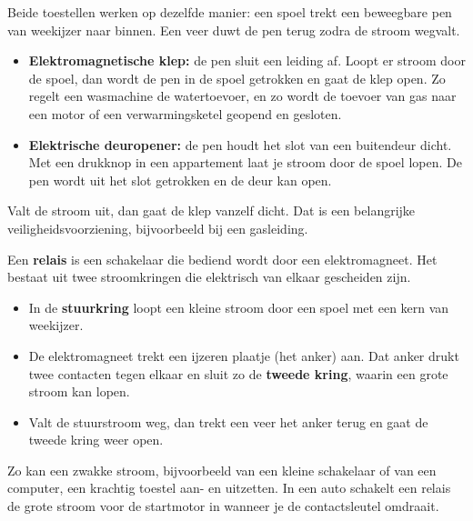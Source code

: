 \documentclass{ximera}
\begin{document}
\begin{example}[expandable=true,title={Extra: elektromagnetische klep en elektrische deuropener}]\nl
    Beide toestellen werken op dezelfde manier: een spoel trekt een beweegbare pen van weekijzer naar binnen. Een veer duwt de pen terug zodra de stroom wegvalt.
    \begin{itemize}
        \item \textbf{Elektromagnetische klep:} de pen sluit een leiding af. Loopt er stroom door de spoel, dan wordt de pen in de spoel getrokken en gaat de klep open. Zo regelt een wasmachine de watertoevoer, en zo wordt de toevoer van gas naar een motor of een verwarmingsketel geopend en gesloten.
        \item \textbf{Elektrische deuropener:} de pen houdt het slot van een buitendeur dicht. Met een drukknop in een appartement laat je stroom door de spoel lopen. De pen wordt uit het slot getrokken en de deur kan open.
    \end{itemize}
    Valt de stroom uit, dan gaat de klep vanzelf dicht. Dat is een belangrijke veiligheidsvoorziening, bijvoorbeeld bij een gasleiding.
\end{example}

\begin{example}[expandable=true,title={Extra: relais}]\nl
    Een \textbf{relais} is een schakelaar die bediend wordt door een elektromagneet. Het bestaat uit twee stroomkringen die elektrisch van elkaar gescheiden zijn.
    \begin{itemize}
        \item In de \textbf{stuurkring} loopt een kleine stroom door een spoel met een kern van weekijzer.
        \item De elektromagneet trekt een ijzeren plaatje (het anker) aan. Dat anker drukt twee contacten tegen elkaar en sluit zo de \textbf{tweede kring}, waarin een grote stroom kan lopen.
        \item Valt de stuurstroom weg, dan trekt een veer het anker terug en gaat de tweede kring weer open.
    \end{itemize}
    Zo kan een zwakke stroom, bijvoorbeeld van een kleine schakelaar of van een computer, een krachtig toestel aan- en uitzetten. In een auto schakelt een relais de grote stroom voor de startmotor in wanneer je de contactsleutel omdraait.
\end{example}
\end{document}
